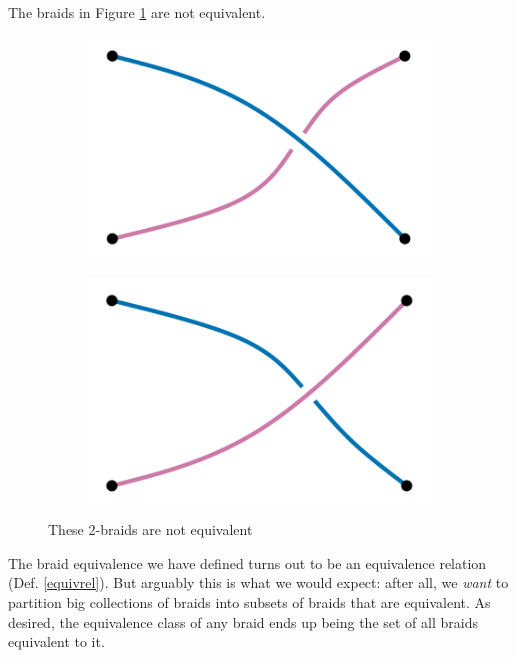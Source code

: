 \documentclass{amsart}
\begin{document}
\begin{example}
 	The braids in Figure \ref{unequal2braids} are not equivalent. 
	\begin{figure}[h]
		\begin{subfigure}{.5\textwidth}
			\centering
			\includegraphics[width=.9\linewidth]{Inkscape Files/2braid.png}
		\end{subfigure}%
		\begin{subfigure}{.5\textwidth}
			\centering
			\includegraphics[width=.9\linewidth]{Inkscape Files/2braid2.png}
		\end{subfigure}
		\caption{These 2-braids are not equivalent}
		\label{unequal2braids}
	\end{figure}
\end{example}

The braid equivalence we have defined turns out to be an equivalence relation
(Def. \ref{equivrel}). But arguably this is what we would expect: after all, we
\emph{want} to partition big collections of braids into subsets of braids that are
equivalent. As desired, the equivalence class of any braid ends up being the
set of all braids equivalent to it.
\end{document}
